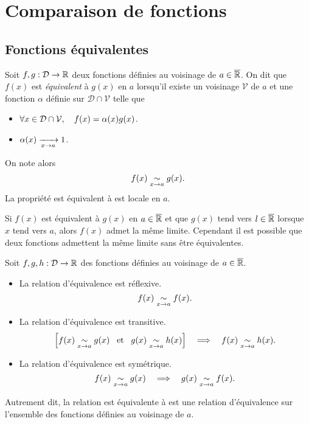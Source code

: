 \documentclass{magnoliaold}
\begin{document}
\section{Comparaison de fonctions}
\subsection{Fonctions équivalentes}



\begin{definition}[utile=-3]
Soit $f,g:\mathcal{D}\to\mathbb{R}$ deux fonctions définies au voisinage de $a\in\overline{\mathbb{R}}$. On dit
que $f(x)$ est \emph{équivalent} à $g(x)$ en $a$ lorsqu'il existe un voisinage $\mathcal{V}$ de $a$ et une fonction $\alpha$ définie sur $\mathcal{D}\cap\mathcal{V}$ telle que
\begin{itemize}
\item $\forall x\in\mathcal{D}\cap\mathcal{V},\quad f(x)=\alpha(x)g(x)$.
\item $\alpha(x)\xrightarrow[x\rightarrow a]{}1$.
\end{itemize}
On note alors
\[f(x)\underset{x\rightarrow a}{\sim} g(x).\]
La propriété \og est équivalent à \fg est locale en $a$.
\end{definition}

\begin{remarqueUnique}
\remarque Si $f(x)$ est équivalent à $g(x)$ en $a\in\overline{\mathbb{R}}$ et que $g(x)$ tend vers
  $l\in\overline{\mathbb{R}}$ lorsque $x$ tend vers $a$, alors $f(x)$ admet la même limite. Cependant
  il est possible que deux fonctions admettent la même limite sans être
  équivalentes.
\end{remarqueUnique}

\begin{proposition}[utile=-3]
Soit $f,g,h:\mathcal{D}\to\mathbb{R}$ des fonctions définies au voisinage de $a\in\overline{\mathbb{R}}$.
\begin{itemize}
\item La relation d'équivalence est réflexive.
  \[f(x)\underset{x\rightarrow a}{\sim} f(x).\]
\item La relation d'équivalence est transitive.
  \[\left[f(x)\underset{x\rightarrow a}{\sim}g(x) \quad\!\text{et}\quad\! g(x)\underset{x\rightarrow a}{\sim}h(x)\right]\quad\Longrightarrow\quad
    f(x)\underset{x\rightarrow a}{\sim}h(x).\]
\item La relation d'équivalence est symétrique.
  \[f(x)\underset{x\rightarrow a}{\sim}g(x) \quad\Longrightarrow\quad g(x)\underset{x\rightarrow a}{\sim}f(x).\]
\end{itemize}
Autrement dit, la relation \og est équivalente à \fg est une relation d'équivalence sur
l'ensemble des fonctions définies au voisinage de $a$. 
\end{proposition}
\end{document}
